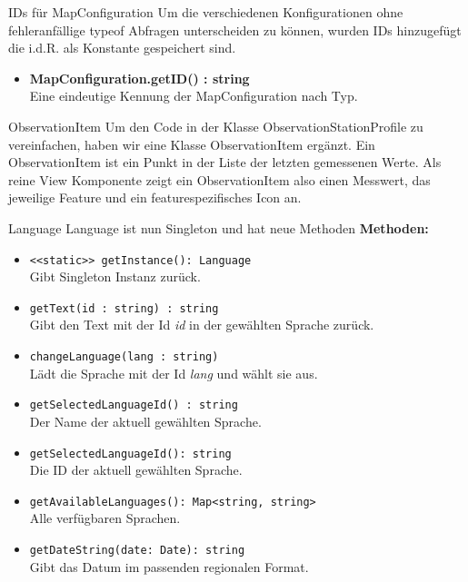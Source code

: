 \begin{Change}{IDs für MapConfiguration}
    Um die verschiedenen Konfigurationen ohne fehleranfällige typeof Abfragen unterscheiden
    zu können, wurden IDs hinzugefügt die i.d.R. als Konstante gespeichert sind.
    \begin{itemize}
        \item \textbf{MapConfiguration.getID() : string}
        \\ Eine eindeutige Kennung der MapConfiguration nach Typ.
    \end{itemize}
\end{Change}

\begin{Change}{ObservationItem}
    Um den Code in der Klasse ObservationStationProfile zu vereinfachen, haben wir eine Klasse ObservationItem ergänzt. Ein ObservationItem ist ein Punkt in der Liste der letzten gemessenen Werte. Als reine View Komponente zeigt ein ObservationItem also einen Messwert, das jeweilige Feature und ein featurespezifisches Icon an.
\end{Change}

\begin{Change}{Language}
    Language ist nun Singleton und hat neue Methoden
    \textbf{Methoden:}
    \begin{itemize}
        \item \texttt{<<static>> getInstance(): Language}
        \\Gibt Singleton Instanz zurück.
        \item \texttt{getText(id : string) : string}
        \\ Gibt den Text mit der Id \emph{id} in der gewählten Sprache zurück.
        \item \texttt{changeLanguage(lang : string)}
        \\ Lädt die Sprache mit der Id \emph{lang} und wählt sie aus.
        \item \texttt{getSelectedLanguageId() : string}
        \\ Der Name der aktuell gewählten Sprache.
        \item \texttt{getSelectedLanguageId(): string}
        \\ Die ID der aktuell gewählten Sprache.
        \item \texttt{getAvailableLanguages(): Map<string, string>}
        \\ Alle verfügbaren Sprachen.
        \item \texttt{getDateString(date: Date): string}
        \\ Gibt das Datum im passenden regionalen Format.
    \end{itemize}

\end{Change}